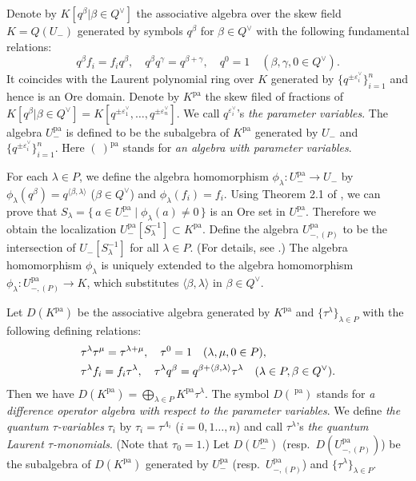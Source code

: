 \documentclass[12pt,twoside]{article}
\newcommand\tU{{\widetilde U}}
\newcommand\eps{\varepsilon}
\newcommand\epsv{\eps^\vee}
\newcommand\Qv{Q^\vee}
\newcommand\bra{\langle}
\newcommand\ket{\rangle}
\newcommand\pa{{\mathrm{pa}}}
\theoremstyle{plain} %
\theoremstyle{definition} %
\theoremstyle{definition} %
\numberwithin{theorem}{section}
\numberwithin{equation}{section}
\numberwithin{figure}{section}
\numberwithin{table}{section}
\begin{document}
Denote by $K[q^\beta|\beta\in\Qv]$ the associative algebra over 
the skew field $K=Q(U_-)$ generated by symbols $q^\beta$
for $\beta\in\Qv$ with the following fundamental relations:
\begin{equation*}
 q^\beta f_i = f_i q^\beta, \quad
 q^\beta q^\gamma = q^{\beta+\gamma}, \quad
 q^0 = 1 \quad (\beta,\gamma,0\in\Qv).
\end{equation*}
It coincides with the Laurent polynomial ring over $K$ 
generated by $\{q^{\pm\epsv_i}\}_{i=1}^n$ 
and hence is an Ore domain.
Denote by $K^\pa$ the skew filed of fractions 
of $K[q^\beta|\beta\in\Qv]=K[q^{\pm\epsv_1},\ldots,q^{\pm\epsv_n}]$.
We call $q^{\epsv_i}$'s {\em the parameter variables}. 
The algebra $U_-^\pa$ %
is defined to be the subalgebra of $K^\pa$
generated by $U_-$ %
and $\{q^{\pm\epsv_i}\}_{i=1}^n$.
Here $(\ )^\pa$ stands for {\em an algebra with parameter variables}.

For each $\lambda\in P$, 
we define the algebra homomorphism $\phi_\lambda:U_-^\pa\to U_-$ 
by $\phi_\lambda(q^\beta)=q^{\bra\beta,\lambda\ket}$ ($\beta\in\Qv$) 
and $\phi_\lambda(f_i)=f_i$.
Using Theorem 2.1 of \cite{S-1971}, we can prove that 
$S_\lambda = \{\, a\in U_-^\pa \mid \phi_\lambda(a)\ne 0\,\}$
is an Ore set in $U_-^\pa$. Therefore we obtain the localization
$U_-^\pa[S_\lambda^{-1}]\subset K^\pa$.
Define the algebra $U_{-,(P)}^\pa$ to be the intersection 
of $U_-[S_\lambda^{-1}]$ for all $\lambda\in P$.
(For details, see \cite{Kuroki2012a}.)
The algebra homomorphism $\phi_\lambda$ is uniquely extended to
the algebra homomorphism $\phi_\lambda:U_{-,(P)}^\pa\to K$,
which substitutes $\bra\beta,\lambda\ket$ in $\beta\in\Qv$.

Let $D(K^\pa)$ be the associative algebra generated by $K^\pa$ and $\{\tau^\lambda\}_{\lambda\in P}$
with the following defining relations:
\begin{align}
 &
 \tau^\lambda\tau^\mu = \tau^{\lambda+\mu}, \quad
 \tau^0 = 1 \quad (\lambda,\mu,0\in P),
 \notag
 \\ &
 \tau^\lambda f_i = f_i \tau^\lambda, \quad
 \tau^\lambda q^\beta = q^{\beta + \bra\beta,\lambda\ket} \tau^\lambda \quad
 (\lambda\in P, \beta\in\Qv). 
 \label{eq:tau-def}
\end{align}
Then we have $D(K^\pa) = \bigoplus_{\lambda\in P} K^\pa \tau^\lambda$.
The symbol $D({\ }^\pa)$ stands for 
{\em a difference operator algebra with respect to the parameter variables}.
We define {\em the quantum $\tau$-variables} $\tau_i$ 
by $\tau_i=\tau^{\Lambda_i}$
($i=0,1\ldots,n$) and call $\tau^\lambda$'s 
{\em the quantum Laurent $\tau$-monomials}.
(Note that $\tau_0=1$.)
Let $D(U_-^\pa)$ (resp.\ $D(U_{-,(P)}^\pa)$) 
be the subalgebra of $D(K^\pa)$ generated by 
$U_-^\pa$ (resp.\ $U_{-,(P)}^\pa$) and $\{\tau^\lambda\}_{\lambda\in P}$.
\end{document}
